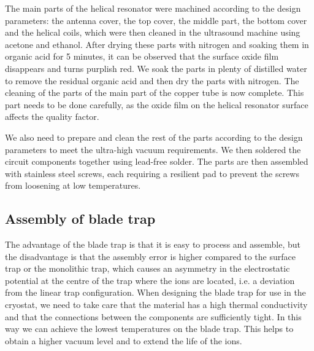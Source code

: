 The main parts of the helical resonator were machined according to the design parameters: the antenna cover, the top cover, the middle part, the bottom cover and the helical coils, which were then cleaned in the ultrasound machine using acetone and ethanol. After drying these parts with nitrogen and soaking them in organic acid for 5 minutes, it can be observed that the surface oxide film disappears and turns purplish red. We soak the parts in plenty of distilled water to remove the residual organic acid and then dry the parts with nitrogen. The cleaning of the parts of the main part of the copper tube is now complete. This part needs to be done carefully, as the oxide film on the helical resonator surface affects the quality factor.

We also need to prepare and clean the rest of the parts according to the design parameters to meet the ultra-high vacuum requirements. We then soldered the circuit components together using lead-free solder. The parts are then assembled with stainless steel screws, each requiring a resilient pad to prevent the screws from loosening at low temperatures.

\subsection{Assembly of blade trap}

The advantage of the blade trap is that it is easy to process and assemble, but the disadvantage is that the assembly error is higher compared to the surface trap or the monolithic trap, which causes an asymmetry in the electrostatic potential at the centre of the trap where the ions are located, i.e. a deviation from the linear trap configuration. When designing the blade trap for use in the cryostat, we need to take care that the material has a high thermal conductivity and that the connections between the components are sufficiently tight. In this way we can achieve the lowest temperatures on the blade trap. This helps to obtain a higher vacuum level and to extend the life of the ions.

